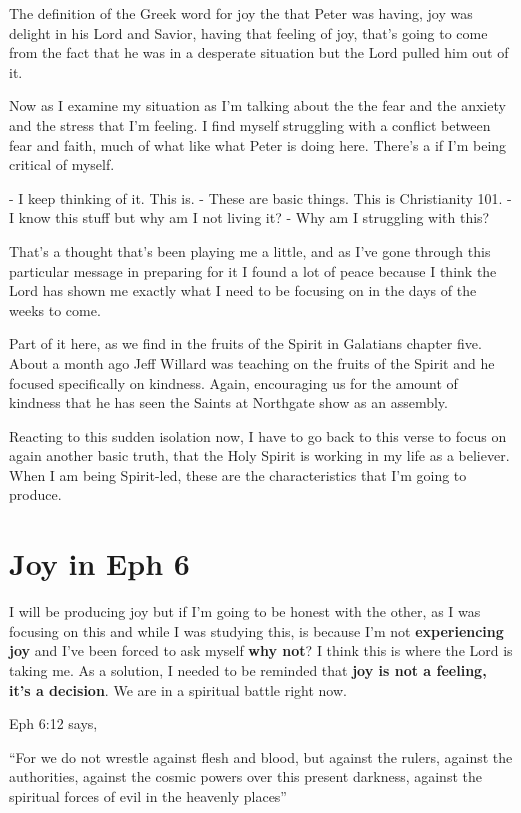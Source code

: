 \documentclass[11pt]{article} %
\begin{document}
The definition of the Greek word for joy the that Peter was having,  joy was delight in his
Lord and Savior, having that feeling of joy, that's going to come from the fact that he was
in a desperate situation but the Lord pulled him out of it.

Now as I examine my situation as I'm talking about the the fear and the anxiety and the
stress that I'm feeling. I find myself struggling with a conflict between fear and faith,
much of what like what Peter is doing here. There's a if I'm being critical of myself.

- I keep thinking of it. This is.
- These are basic things. This is Christianity 101.
- I know this stuff but why am I not living it?
- Why am I struggling with this?

That's a thought that's been playing me a little, and as I've gone through this particular
message in preparing for it I found a lot of peace because I think the Lord has shown
me exactly what I need to be focusing on in the days of the weeks to come.

Part of it here, as we find in the fruits of the Spirit in Galatians chapter five. About a month
ago Jeff Willard was teaching on the fruits of the Spirit and he focused specifically on kindness.
Again, encouraging us for the amount of kindness that he has seen the Saints at Northgate
show as an assembly.

Reacting to this sudden isolation now, I have to go back to this verse to focus on again
another basic truth, that the Holy Spirit is working in my life as a believer. When I am
being Spirit-led, these are the characteristics that I'm going to produce.

\section{Joy in Eph 6}

I will be producing joy but if I'm going to be honest with the other, as I was focusing on
this and while I was studying this, is because I'm not \textbf{experiencing joy} and
I've been forced to ask myself \textbf{why not}? I think this is where the Lord is taking
me. As a solution, I needed to be reminded that \textbf{joy is not a feeling, it's a decision}.
We are in a spiritual battle right now.

Eph 6:12 says,

``For we do not wrestle against flesh and blood, but against the rulers, against the authorities,
against the cosmic powers over this present darkness, against the spiritual forces of evil in the
heavenly places''
\end{document}
